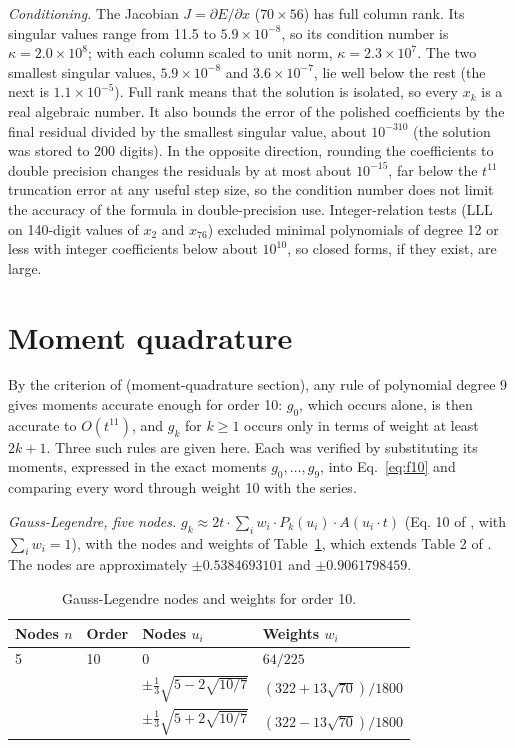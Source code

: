 \documentclass[12pt]{article}
\begin{document}
\emph{Conditioning.} The Jacobian $J=\partial E/\partial x$ ($70\times56$) has full column rank. Its singular values range from 11.5 to $5.9\times10^{-8}$, so its condition number is $\kappa=2.0\times10^{8}$; with each column scaled to unit norm, $\kappa=2.3\times10^{7}$. The two smallest singular values, $5.9\times10^{-8}$ and $3.6\times10^{-7}$, lie well below the rest (the next is $1.1\times10^{-5}$). Full rank means that the solution is isolated, so every $x_k$ is a real algebraic number. It also bounds the error of the polished coefficients by the final residual divided by the smallest singular value, about $10^{-310}$ (the solution was stored to 200 digits). In the opposite direction, rounding the coefficients to double precision changes the residuals by at most about $10^{-15}$, far below the $t^{11}$ truncation error at any useful step size, so the condition number does not limit the accuracy of the formula in double-precision use. Integer-relation tests (LLL on 140-digit values of $x_{2}$ and $x_{76}$) excluded minimal polynomials of degree 12 or less with integer coefficients below about $10^{10}$, so closed forms, if they exist, are large.

\section*{Moment quadrature}

By the criterion of \cite{j28} (moment-quadrature section), any rule of polynomial degree 9 gives moments accurate enough for order 10: $g_0$, which occurs alone, is then accurate to $O(t^{11})$, and $g_k$ for $k\ge1$ occurs only in terms of weight at least $2k+1$. Three such rules are given here. Each was verified by substituting its moments, expressed in the exact moments $g_0,\ldots,g_9$, into Eq.~\ref{eq:f10} and comparing every word through weight 10 with the series.

\emph{Gauss-Legendre, five nodes.} $g_k\approx 2t\cdot\sum_i w_i\cdot P_k(u_i)\cdot A(u_i\cdot t)$ (Eq. 10 of \cite{j28}, with $\sum_i w_i=1$), with the nodes and weights of Table~\ref{tab:gl5}, which extends Table 2 of \cite{j28}. The nodes are approximately $\pm0.5384693101$ and $\pm0.9061798459$.

\begin{table}[H]
\centering\small
\caption{Gauss-Legendre nodes and weights for order 10.}\label{tab:gl5}
\begin{tabular}{llll}
\hline
Nodes $n$ & Order & Nodes $u_i$ & Weights $w_i$ \\ \hline
5 & 10 & $0$ & $64/225$ \\
 &  & $\pm\frac{1}{3}\sqrt{5-2\sqrt{10/7}}$ & $(322+13\sqrt{70})/1800$ \\
 &  & $\pm\frac{1}{3}\sqrt{5+2\sqrt{10/7}}$ & $(322-13\sqrt{70})/1800$ \\ \hline
\end{tabular}
\end{table}
\end{document}
